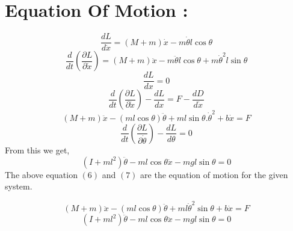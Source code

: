 \documentclass[11pt]{article}
\begin{document}
\section{Equation Of Motion :}
$$\frac{dL}{d\dot{x}} = (M+m)\dot{x} - m\dot{\theta}l\cos{\theta} $$
$$\frac{d}{dt}\left(\frac{\partial L}{\partial \dot{x}}\right) = (M+m)\ddot{x} - m\ddot{\theta}l\cos{\theta} + m\dot{\theta}^2l\sin{\theta}$$
$$\frac{dL}{dx} = 0$$
$$\frac{d}{dt}\left(\frac{\partial L}{\partial \dot{x}}\right) - \frac{dL}{dx} = F - \frac{dD}{d\dot{x}}$$
\begin{equation}
(M+m)\ddot{x} - (ml\cos{\theta})\ddot{\theta} + ml\sin{\theta}.\dot{\theta}^2 + b\dot{x} = F
\end{equation}
$$\frac{d}{dt}\left(\frac{\partial L}{\partial \dot{\theta}}\right) - \frac{dL}{d{\theta}} = 0$$
{From this we get, }
\begin{equation}
(I+ml^2)\ddot{\theta} - ml\cos{\theta}\ddot{x} - mgl\sin{\theta} = 0
\end{equation}
{
The above equation $(6)$ and $(7)$ are the equation of motion for the given system. }
\begin{flushleft} 
\end{flushleft}
\begin{equation}
(M+m)\ddot{x} - (ml\cos{\theta})\ddot{\theta} + ml\dot{\theta}^2\sin{\theta} + b\dot{x} = F
\end{equation}
\begin{equation}
(I+ml^2)\ddot{\theta} - ml\cos{\theta}\ddot{x} - mgl\sin{\theta} = 0
\end{equation}
\end{document}
